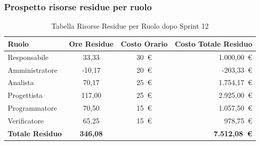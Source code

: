 \subsubsection{Prospetto risorse residue per ruolo}
\begin{table}[H]
    \centering
    \renewcommand{\arraystretch}{1.3}
    \begin{tabularx}{\textwidth}{|X|c|c|r|}
        \hline
        \textbf{Ruolo} & \textbf{Ore Residue} & \textbf{Costo Orario} &
        \textbf{Costo Totale Residuo} \\
        \hline
        Responsabile   & 33,33 & 30~\euro & 1.000{,}00~\euro \\
        Amministratore & -10,17 & 20~\euro &  -203{,}33~\euro \\
        Analista       & 70,17 & 25~\euro & 1.754{,}17~\euro \\
        Progettista    & 117,00 & 25~\euro & 2.925{,}00~\euro \\
        Programmatore  & 70,50 & 15~\euro & 1.057{,}50~\euro \\
        Verificatore   & 65,25 & 15~\euro & 978{,}75~\euro \\
        \hline
        \textbf{Totale Residuo} & \textbf{346,08} & &
        \textbf{7.512{,}08~\euro} \\
        \hline
    \end{tabularx}
    \caption{Tabella Risorse Residue per Ruolo dopo Sprint 12}
\end{table}

